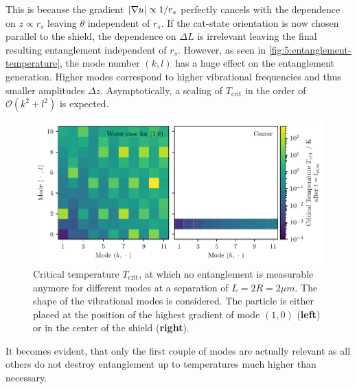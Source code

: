 This is because the gradient $\left\lvert\nabla u\right\rvert \propto 1/r_s$ perfectly cancels with the dependence on $z \propto r_s$ leaving $\theta$ independent of $r_s$. 
If the cat-state orientation is now chosen parallel to the shield, the dependence on $\Delta L$ is irrelevant leaving the final resulting entanglement independent of $r_s$.
However, as seen in \cref{fig:5:entanglement-temperature}, the mode number $(k,l)$ has a huge effect on the entanglement generation. Higher modes correspond to higher vibrational frequencies and thus smaller amplitudes $\Delta z$.
Asymptotically, a scaling of $T_\mathrm{crit}$ in the order of $\mathcal{O}(k^2 + l^2)$ is expected.
\begin{figure}[!htbp]
  \centering
  \includegraphics[width=\textwidth]{./../figures/vibrations/T-crit-modes.pdf}
  \caption{Critical temperature $T_\mathrm{crit}$, at which no entanglement is measurable anymore for different modes at a separation of $L = 2R = 2\si{\mu m}$. The shape of the vibrational modes is considered. The particle is either placed at the position of the highest gradient of mode $(1,0)$ (\textbf{left}) or in the center of the shield (\textbf{right}).}
  \label{fig:5:T-crit-modes}
\end{figure}
It becomes evident, that only the first couple of modes are actually relevant as all others do not destroy entanglement up to temperatures much higher than necessary.



